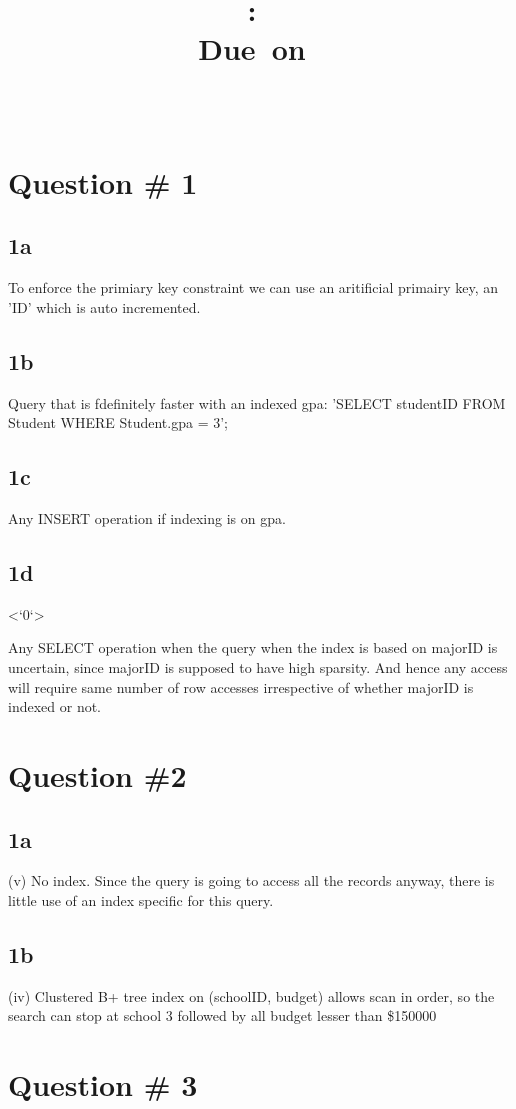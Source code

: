 \documentclass[a4paper,11pt,x11names]{article}
\title{
\vspace{2in}
\textmd{\textbf{\hmwkClass:\ \hmwkTitle}}\\
\normalsize\vspace{0.1in}\small{Due\ on\ \hmwkDueDate}\\
\vspace{3in}
}
\author{\textbf{\hmwkAuthorName} \\
	\textbf{\hmwkAuthorID}
	}
\date{} %
\begin{document}
\maketitle
\clearpage

\section{Question \# 1} %
\subsection{1a}
To enforce the primiary key constraint we can use an aritificial primairy key, an 'ID'
which is auto incremented.

\subsection{1b}

Query that is fdefinitely faster with an indexed gpa: 'SELECT studentID FROM Student WHERE Student.gpa = 3';

\subsection{1c}

Any INSERT operation if indexing is on gpa.


\subsection{1d}<`0`>

Any SELECT operation when the query when the index is based on  majorID is uncertain, since majorID
is supposed to have high sparsity. And hence any access will require same number of row accesses
irrespective of whether majorID is indexed or not.

\section{Question \#2}

\subsection{1a}
(v) No index. Since the query is going to access all the records anyway, there is little use of an index 
specific for this query.

\subsection{1b}
(iv) Clustered B+ tree index on (schoolID, budget) allows scan in order, so the search can stop at school 3
followed by all budget lesser than \$150000

\section{Question \# 3}
\end{document}
